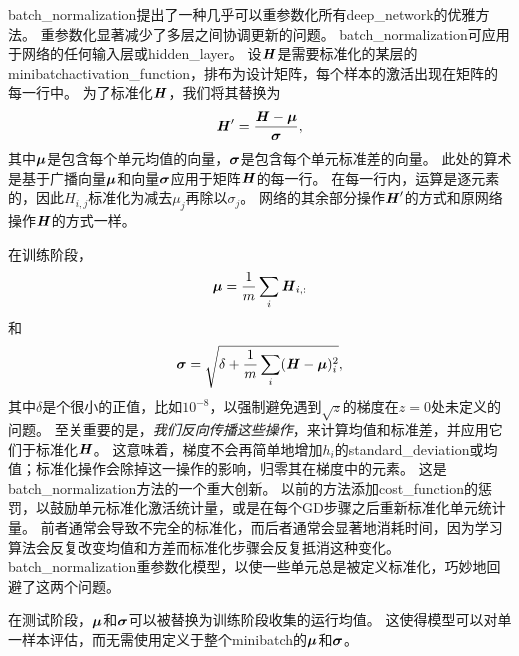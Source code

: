 
\gls{batch_normalization}提出了一种几乎可以重参数化所有\gls{deep_network}的优雅方法。
重参数化显著减少了多层之间协调更新的问题。
\gls{batch_normalization}可应用于网络的任何输入层或\gls{hidden_layer}。
设$\boldsymbol{\mathit{H}}$是需要标准化的某层的\gls{minibatch}\gls{activation_function}，排布为设计矩阵，每个样本的激活出现在矩阵的每一行中。
为了标准化$\boldsymbol{\mathit{H}}$，我们将其替换为
\begin{equation}
\boldsymbol{\mathit{H}}' = \frac{\boldsymbol{\mathit{H}} - \boldsymbol{\mu}}{\boldsymbol{\sigma}},
\end{equation}
其中$\boldsymbol{\mu}$是包含每个单元均值的向量，$\boldsymbol{\sigma}$是包含每个单元标准差的向量。
此处的算术是基于广播向量$\boldsymbol{\mu}$和向量$\boldsymbol{\sigma}$应用于矩阵$\boldsymbol{\mathit{H}}$的每一行。
在每一行内，运算是逐元素的，因此$H_{i,j}$标准化为减去$\mu_j$再除以$\sigma_j$。
网络的其余部分操作$\boldsymbol{\mathit{H}}'$的方式和原网络操作$\boldsymbol{\mathit{H}}$的方式一样。

在训练阶段，
\begin{equation}
    \boldsymbol{\mu} = \frac{1}{m} \sum_i \boldsymbol{\mathit{H}}_{i,:}
\end{equation}
和
\begin{equation}
    \boldsymbol{\sigma} = \sqrt{ \delta + \frac{1}{m} \sum_i (\boldsymbol{\mathit{H}} - \boldsymbol{\mu})_i^2 },
\end{equation}
其中$\delta$是个很小的正值，比如$10^{-8}$，以强制避免遇到$\sqrt{z}$的梯度在$z=0$处未定义的问题。
至关重要的是，\emph{我们反向传播这些操作}，来计算均值和标准差，并应用它们于标准化$\boldsymbol{\mathit{H}}$。
这意味着，梯度不会再简单地增加$h_i$的\gls{standard_deviation}或均值；标准化操作会除掉这一操作的影响，归零其在梯度中的元素。
这是\gls{batch_normalization}方法的一个重大创新。
以前的方法添加\gls{cost_function}的惩罚，以鼓励单元标准化激活统计量，或是在每个\gls{GD}步骤之后重新标准化单元统计量。
前者通常会导致不完全的标准化，而后者通常会显著地消耗时间，因为学习算法会反复改变均值和方差而标准化步骤会反复抵消这种变化。
\gls{batch_normalization}重参数化模型，以使一些单元总是被定义标准化，巧妙地回避了这两个问题。


在测试阶段，$\boldsymbol{\mu}$和$\boldsymbol{\sigma}$可以被替换为训练阶段收集的运行均值。
这使得模型可以对单一样本评估，而无需使用定义于整个\gls{minibatch}的$\boldsymbol{\mu}$和$\boldsymbol{\sigma}$。

